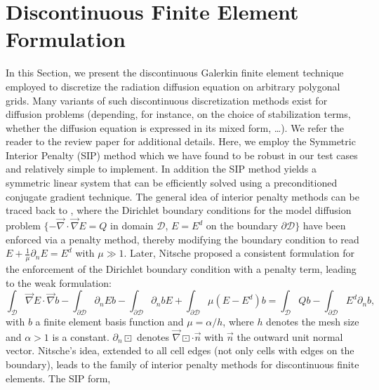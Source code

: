 \documentclass[preprint,10pt]{elsarticle}
\renewcommand{\div}{\vec{\nabla}\! \cdot \!}
\newcommand{\grad}{\vec{\nabla}}
\newcommand{\D}{\mathcal{D}}
\newcommand{\vn}{\vec{n}}
\newcommand{\tf}{b}
\begin{document}
\section{Discontinuous Finite Element Formulation} \label{sec:ip}

In this Section, we present the discontinuous Galerkin finite element technique employed to
discretize the radiation diffusion equation on arbitrary polygonal grids. Many variants of such discontinuous discretization
methods exist for diffusion problems (depending, for instance, on the choice of stabilization terms, whether 
the diffusion equation is expressed in its mixed form, \ldots). We refer the reader to the review
paper \cite{DouglasN.Arnold2002} for additional details. Here, we employ the Symmetric
Interior Penalty (SIP) method which we have found to be robust in our test cases and relatively simple 
to implement. In addition the SIP method yields a symmetric linear system that can be efficiently solved using
a preconditioned conjugate gradient technique.
The general idea of interior penalty methods can be traced back to \cite{lions1968}, where the Dirichlet
boundary conditions for the model diffusion problem $\{-\div \grad E = Q$ in domain $\D$, $E=E^d$ on 
the boundary $\partial \D\}$ have been enforced via a penalty method, thereby modifying the 
boundary condition to read $E+\frac{1}{\mu}\partial_n E = E^d$ with $\mu\gg 1$. Later, 
Nitsche \cite{nitsche1971} proposed a consistent formulation for the enforcement of the 
Dirichlet boundary condition with a penalty term, leading to the weak formulation:
\begin{equation}
\label{eq:penalty_nitsche_bd_only}
\int_{\D} \grad E \cdot \grad \tf
- \int_{\partial\D} \partial_n E \tf  
- \int_{\partial\D} \partial_n \tf E 
+ \int_{\partial\D} \mu(E-E^d) \tf 
=
\int_{\D} Q \tf 
- \int_{\partial\D} E^d \partial_n \tf ,
\end{equation}
with $\tf$ a finite element basis function and $\mu=\alpha/h$, where $h$ denotes 
the mesh size and $\alpha>1$ is a constant. $\partial_n \boxdot$ denotes $ \grad \boxdot \cdot \vn$ with $\vn$ the outward unit normal vector.
%
Nitsche's idea, extended to all cell edges (not only cells with edges on the boundary), leads
to the family of interior penalty methods for discontinuous finite elements. The SIP form,
\end{document}
